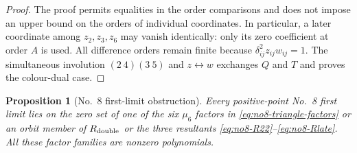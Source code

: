 \documentclass[11pt]{amsart}
\newtheorem{proposition}[theorem]{Proposition}
\theoremstyle{remark}
\begin{document}
\begin{proof}
The proof permits equalities in the order comparisons and does not impose an upper bound on the orders of individual coordinates. In particular, a later coordinate among $z_2,z_3,z_6$ may vanish identically: only its zero coefficient at order $A$ is used. All difference orders remain finite because $\delta_{ij}^2z_{ij}w_{ij}=1$. The simultaneous involution $(2\ 4)(3\ 5)$ and $z\leftrightarrow w$ exchanges $Q$ and $T$ and proves the colour-dual case.
\end{proof}


\begin{proposition}[No.~8 first-limit obstruction]
\label{prop:no8-locus}
Every positive-point No.~8 first limit lies on the
zero set of one of the six $\mu_6$ factors in
\eqref{eq:no8-triangle-factors} or an orbit member
of $R_{\rm double}$ or the three resultants
\eqref{eq:no8-R22}--\eqref{eq:no8-Rlate}. All these factor
families are nonzero polynomials.
\end{proposition}
\end{document}
